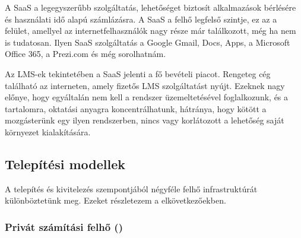 A SaaS a legegyszerűbb szolgáltatás, lehetőséget biztosít alkalmazások bérlésére és használati idő alapú számlázásra\cite{ccwlinux}. A SaaS a felhő legfelső szintje, ez az a felület, amellyel az internetfelhasználók nagy része már találkozott, még ha nem is tudatosan. Ilyen SaaS szolgáltatás a Google Gmail, Docs, Apps, a Microsoft Office 365, a Prezi.com és még sorolhatnám.

Az LMS-ek tekintetében a SaaS jelenti a fő bevételi piacot. Rengeteg cég található az interneten, amely fizetős LMS szolgáltatást nyújt. Ezeknek nagy előnye, hogy egyáltalán nem kell a rendszer üzemeltetésével foglalkozunk, és a tartalomra, oktatási anyagra koncentrálhatunk, hátránya, hogy kötött a mozgásterünk egy ilyen rendszerben, nincs vagy korlátozott a lehetőség saját környezet kialakítására.

\subsection{Telepítési modellek}


A telepítés és kivitelezés szempontjából négyféle felhő infrastruktúrát különböztetünk meg\cite{nistsp800-145}. Ezeket részletezem a elkövetkezőekben.

\subsubsection{Privát számítási felhő ()}

